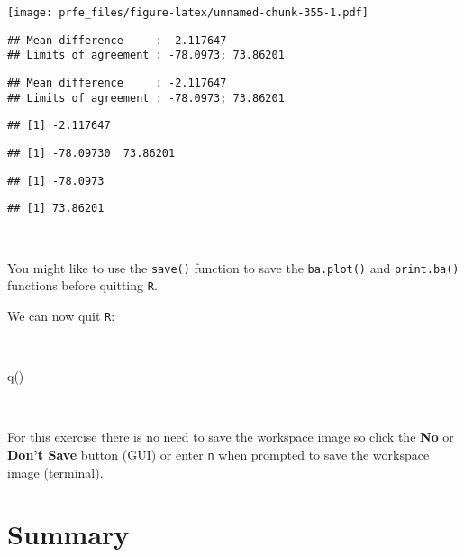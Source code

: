 \documentclass[
  12pt,
  a4paper]{book}
\newenvironment{Shaded}{\begin{snugshade}}{\end{snugshade}}
\newcommand{\FunctionTok}[1]{\textcolor[rgb]{0.00,0.00,0.00}{#1}}
\newcommand{\NormalTok}[1]{#1}
\begin{document}
\texttt{[image: prfe\_files/figure-latex/unnamed-chunk-355-1.pdf]}

\begin{verbatim}
## Mean difference     : -2.117647
## Limits of agreement : -78.0973; 73.86201
\end{verbatim}

\begin{verbatim}
## Mean difference     : -2.117647
## Limits of agreement : -78.0973; 73.86201
\end{verbatim}

\begin{verbatim}
## [1] -2.117647
\end{verbatim}

\begin{verbatim}
## [1] -78.09730  73.86201
\end{verbatim}

\begin{verbatim}
## [1] -78.0973
\end{verbatim}

\begin{verbatim}
## [1] 73.86201
\end{verbatim}

~

You might like to use the \texttt{save()} function to save the \texttt{ba.plot()} and \texttt{print.ba()} functions before quitting \texttt{R}.

We can now quit \texttt{R}:

~

\begin{Shaded}
\begin{Highlighting}[]
\FunctionTok{q}\NormalTok{()}
\end{Highlighting}
\end{Shaded}

~

For this exercise there is no need to save the workspace image so click the \textbf{No} or \textbf{Don't Save} button (GUI) or enter \texttt{n} when prompted to save the workspace image (terminal).

\hypertarget{summary-6}{%
\section{Summary}\label{summary-6}}
\end{document}
